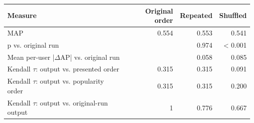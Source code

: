 \begin{tabular}{lrrr}
\toprule
Measure & Original order & Repeated & Shuffled \\
\midrule
MAP & 0.554 & 0.553 & 0.541 \\
p vs. original run &  & 0.974 & \textless{} 0.001 \\
Mean per-user |$\Delta$AP| vs. original run &  & 0.058 & 0.085 \\
Kendall $\tau$: output vs. presented order & 0.315 & 0.315 & 0.091 \\
Kendall $\tau$: output vs. popularity order & 0.315 & 0.315 & 0.200 \\
Kendall $\tau$: output vs. original-run output & 1 & 0.776 & 0.667 \\
\bottomrule
\end{tabular}
